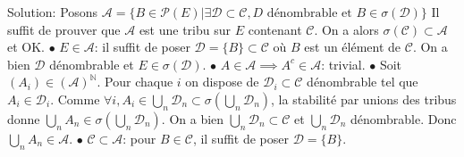 \documentclass{report}
\begin{document}
\subsection{} 

\subsection{} \\

Solution: Posons $\mathcal A = \{B\in \mathcal{P}(E) | \exists \mathcal D \subset \mathcal C, D\text{ dénombrable et } B\in \sigma(\mathcal D)   \} $\newline
Il suffit de prouver que $\mathcal A$ est une tribu sur $E$ contenant $\mathcal C$. On a alors $\sigma(\mathcal C) \subset \mathcal A$ et OK.\newline
$\bullet$ $E\in \mathcal A$: il suffit de poser $\mathcal D = \{B\} \subset \mathcal C$ où $B$ est un élément de $\mathcal C$. On a bien $\mathcal D$ dénombrable et $E\in \sigma(\mathcal D)$.\newline
$\bullet$ $A\in \mathcal A \implies A^c\in \mathcal A$: trivial.\newline
$\bullet$ Soit $(A_i)\in (\mathcal A)^{\mathbb N}$. Pour chaque $i$ on dispose de $\mathcal D_i\subset \mathcal C$ dénombrable tel que $A_i\in \mathcal D_i$. Comme $\displaystyle \forall i, A_i\in \bigcup_n \mathcal D_n\subset \sigma(\bigcup_n \mathcal D_n)$, la stabilité par unions des tribus donne $\displaystyle \bigcup_n A_n\in \sigma(\bigcup_n \mathcal D_n)$. On a bien $\bigcup_n \mathcal D_n \subset \mathcal C$ et $\bigcup_n \mathcal D_n$ dénombrable. Donc $\bigcup_n A_n \in \mathcal A$.\newline
$\bullet$ $\mathcal C \subset \mathcal A$: pour $B\in \mathcal C$, il suffit de poser $\mathcal D =\{B\}$.
\end{document}

